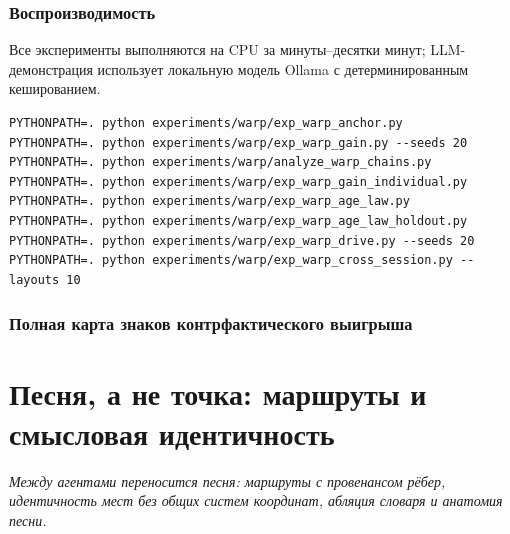 \documentclass{article}
\begin{document}
\section{Воспроизводимость}
\label{p2:app:repro}
Все эксперименты выполняются на CPU за минуты--десятки минут;
LLM-демонстрация использует локальную модель Ollama с
детерминированным кешированием.
\begin{verbatim}
PYTHONPATH=. python experiments/warp/exp_warp_anchor.py
PYTHONPATH=. python experiments/warp/exp_warp_gain.py --seeds 20
PYTHONPATH=. python experiments/warp/analyze_warp_chains.py
PYTHONPATH=. python experiments/warp/exp_warp_gain_individual.py
PYTHONPATH=. python experiments/warp/exp_warp_age_law.py
PYTHONPATH=. python experiments/warp/exp_warp_age_law_holdout.py
PYTHONPATH=. python experiments/warp/exp_warp_drive.py --seeds 20
PYTHONPATH=. python experiments/warp/exp_warp_cross_session.py --layouts 10
\end{verbatim}

\section{Полная карта знаков контрфактического выигрыша}
\label{p2:app:signmap}
\FloatBarrier

\clearpage
\part{Песня, а не точка: маршруты и смысловая идентичность}
\noindent\textit{Между агентами переносится песня: маршруты с провенансом рёбер, идентичность мест без общих систем координат, абляция словаря и анатомия песни.}
\end{document}
